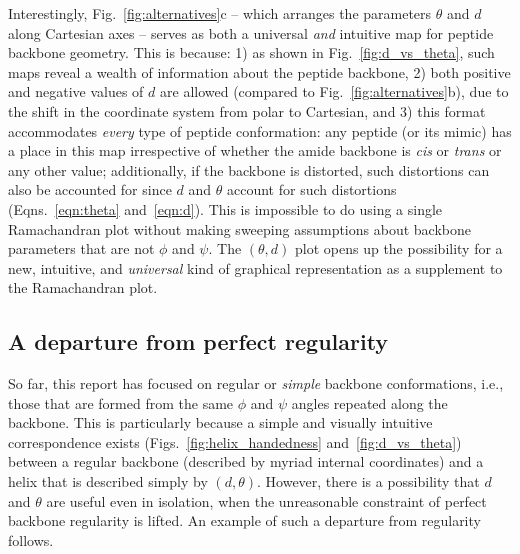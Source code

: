 \documentclass[fleqn,10pt,lineno]{wlpeerj} %
\newcommand{\n}[1]{{\color{black}#1}} %
\newcommand{\Fig}[1]{Fig.~\ref{#1}}
\newcommand{\Figs}[1]{Figs.~\ref{#1}}
\newcommand{\Eqns}[1]{Eqns.~\ref{#1}}
\newcommand{\cis}{{\em{cis}}\xspace}
\newcommand{\trans}{{\em{trans}}\xspace}
\begin{document}
Interestingly, \Fig{fig:alternatives}c -- which arranges the parameters $\theta$ and $d$ along Cartesian axes -- serves as both a universal {\em and} intuitive map for peptide backbone geometry. This is because: 1) as shown in \Fig{fig:d_vs_theta}, such maps reveal a wealth of information about the peptide backbone, 2) both positive and negative values of $d$ are allowed (compared to \Fig{fig:alternatives}b), due to the shift in the coordinate system from polar to Cartesian, and 3) this format accommodates {\it every} type of peptide conformation: any peptide (or its mimic) has a place in this map irrespective of whether the amide backbone is \cis or \trans or any other value; additionally, if the backbone is distorted, such distortions can also be accounted for since $d$ and $\theta$ \n{account for} such distortions (\Eqns{eqn:theta} and~\ref{eqn:d}). This is impossible to do using a single Ramachandran plot without making sweeping assumptions about backbone parameters that are not $\phi$ and $\psi$. The $(\theta,d)$ plot opens up the possibility for a new, intuitive, and {\it universal} kind of graphical representation as a supplement to the Ramachandran plot.

\subsection*{A departure from perfect regularity}
So far, this report has focused on regular or {\em simple}  backbone conformations, i.e., those that are formed from the same $\phi$ and $\psi$ angles repeated along the backbone. This is particularly because a simple and visually intuitive correspondence exists (\Figs{fig:helix_handedness} and~\ref{fig:d_vs_theta}) between a regular backbone (described by myriad internal coordinates) and a helix that is described simply by $(d,\theta)$. 
However, there is a possibility that $d$ and $\theta$ are useful even in isolation, when the unreasonable constraint of perfect backbone regularity is lifted. An example of such a departure from regularity follows. 
\end{document}
